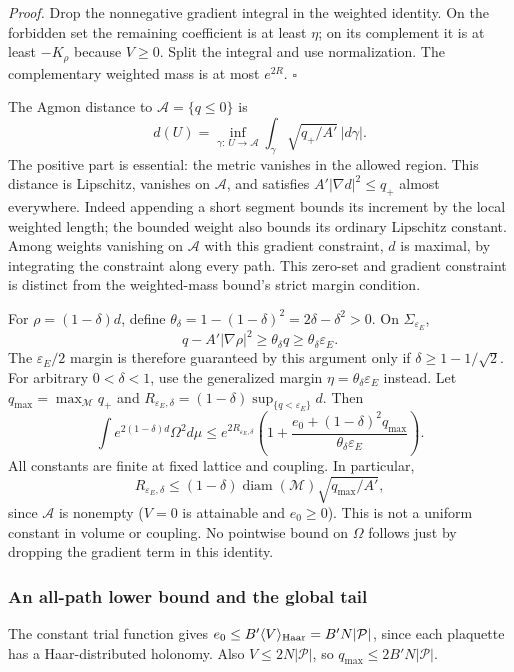 \documentclass[11pt,a4paper]{article}
\begin{document}
\emph{Proof.} Drop the nonnegative gradient integral in the weighted
identity. On the forbidden set the remaining coefficient is at least
\(\eta\); on its complement it is at least \(-K_\rho\) because
\(V\ge0\). Split the integral and use normalization. The complementary
weighted mass is at most \(e^{2R}\). \(\square\)

The Agmon distance to \(\mathcal A=\{q\le0\}\) is
\[d(U)=\inf_{\gamma:\,U\to\mathcal A}
\int_\gamma\sqrt{q_+/A'}\,|d\gamma|.\] The positive part is essential:
the metric vanishes in the allowed region. This distance is Lipschitz,
vanishes on \(\mathcal A\), and satisfies \(A'|\nabla d|^2\le q_+\)
almost everywhere. Indeed appending a short segment bounds its increment
by the local weighted length; the bounded weight also bounds its
ordinary Lipschitz constant. Among weights vanishing on \(\mathcal A\)
with this gradient constraint, \(d\) is maximal, by integrating the
constraint along every path. This zero-set and gradient constraint is
distinct from the weighted-mass bound's strict margin condition.

For \(\rho=(1-\delta)d\), define
\(\theta_\delta=1-(1-\delta)^2=2\delta-\delta^2>0\). On
\(\Sigma_{\varepsilon_E}\),
\[q-A'|\nabla\rho|^2\ge\theta_\delta q\ge\theta_\delta\varepsilon_E.\]
The \(\varepsilon_E/2\) margin is therefore guaranteed by this argument
only if \(\delta\ge1-1/\sqrt2\). For arbitrary \(0<\delta<1\), use the
generalized margin \(\eta=\theta_\delta\varepsilon_E\) instead. Let
\(q_{\max}=\max_{\mathcal M}q_+\) and
\(R_{\varepsilon_E,\delta}=(1-\delta)\sup_{\{q<\varepsilon_E\}}d\). Then
\[\int e^{2(1-\delta)d}\Omega^2d\mu
\le e^{2R_{\varepsilon_E,\delta}}
\left(1+\frac{e_0+(1-\delta)^2q_{\max}}
{\theta_\delta\varepsilon_E}\right).\] All constants are finite at fixed
lattice and coupling. In particular,
\[R_{\varepsilon_E,\delta}\le(1-\delta)\operatorname{diam}(\mathcal M)
\sqrt{q_{\max}/A'},\] since \(\mathcal A\) is nonempty (\(V=0\) is
attainable and \(e_0\ge0\)). This is not a uniform constant in volume or
coupling. No pointwise bound on \(\Omega\) follows just by dropping the
gradient term in this identity.

\hypertarget{an-all-path-lower-bound-and-the-global-tail}{%
\subsubsection{An all-path lower bound and the global
tail}\label{an-all-path-lower-bound-and-the-global-tail}}

The constant trial function gives
\(e_0\le B'\langle V\rangle_{\rm Haar}=B'N|\mathcal P|\), since each
plaquette has a Haar-distributed holonomy. Also \(V\le2N|\mathcal P|\),
so \(q_{\max}\le2B'N|\mathcal P|\).
\end{document}

